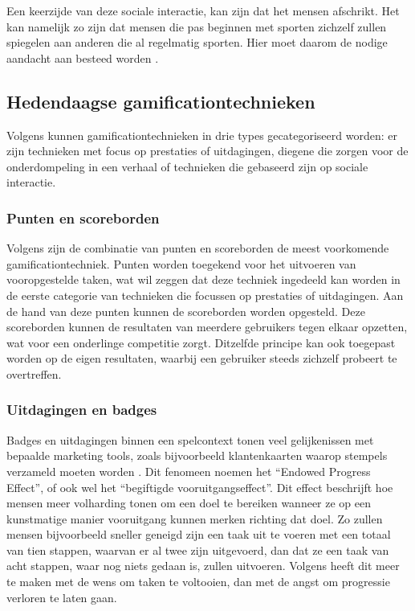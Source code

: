 Een keerzijde van deze sociale interactie, kan zijn dat het mensen afschrikt. Het kan namelijk zo zijn dat mensen die pas beginnen met sporten zichzelf zullen spiegelen aan anderen die al regelmatig sporten. Hier moet daarom de nodige aandacht aan besteed worden \autocite{Jong2010}.

\subsection{Hedendaagse gamificationtechnieken}
\label{ssec:gamificationtechnieken}
Volgens \textcite{Legaki2020} kunnen gamificationtechnieken in drie types gecategoriseerd worden: er zijn technieken met focus op prestaties of uitdagingen, diegene die zorgen voor de onderdompeling in een verhaal of technieken die gebaseerd zijn op sociale interactie.

\subsubsection{Punten en scoreborden}
\label{sssec:labels_scoreborden}
Volgens \textcite{Hamari2014} zijn de combinatie van punten en scoreborden de meest voorkomende gamificationtechniek. Punten worden toegekend voor het uitvoeren van vooropgestelde taken, wat wil zeggen dat deze techniek ingedeeld kan worden in de eerste categorie van technieken die focussen op prestaties of uitdagingen. Aan de hand van deze punten kunnen de scoreborden worden opgesteld. Deze scoreborden kunnen de resultaten van meerdere gebruikers tegen elkaar opzetten, wat voor een onderlinge competitie zorgt. Ditzelfde principe kan ook toegepast worden op de eigen resultaten, waarbij een gebruiker steeds zichzelf probeert te overtreffen.

\subsubsection{Uitdagingen en badges}
Badges en uitdagingen binnen een spelcontext tonen veel gelijkenissen met bepaalde marketing tools, zoals bijvoorbeeld klantenkaarten waarop stempels verzameld moeten worden \autocite{Nunes2006}. Dit fenomeen noemen \textcite{Nunes2006} het ``Endowed Progress Effect'', of ook wel het ``begiftigde vooruitgangseffect''. Dit effect beschrijft hoe mensen meer volharding tonen om een doel te bereiken wanneer ze op een kunstmatige manier vooruitgang kunnen merken richting dat doel. Zo zullen mensen bijvoorbeeld sneller geneigd zijn een taak uit te voeren met een totaal van tien stappen, waarvan er al twee zijn uitgevoerd, dan dat ze een taak van acht stappen, waar nog niets gedaan is, zullen uitvoeren. Volgens \textcite{Nunes2006} heeft dit meer te maken met de wens om taken te voltooien, dan met de angst om progressie verloren te laten gaan.

